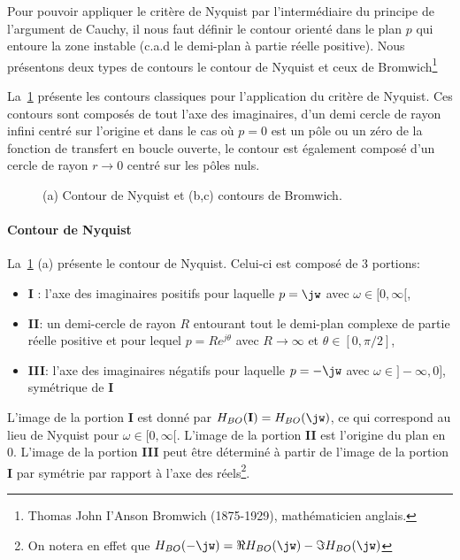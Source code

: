 Pour pouvoir appliquer le critère de Nyquist par l'intermédiaire du principe 
de l'argument de Cauchy, il nous faut définir le contour orienté dans le plan 
$p$ qui entoure la zone instable (c.a.d le demi-plan à partie réelle positive).
Nous présentons deux types de contours le contour de Nyquist et ceux de 
Bromwich\footnote{Thomas John I'Anson Bromwich (1875-1929), mathématicien 
anglais.}

La~\cref{fig-contours} présente les contours classiques pour l'application 
du critère de Nyquist. Ces contours sont composés de tout l'axe des 
imaginaires, d'un demi cercle de rayon infini centré sur l'origine et dans le
cas où $p=0$ est un pôle ou un zéro de la fonction de transfert en boucle 
ouverte, le contour est également composé d'un cercle de rayon 
$r\rightarrow0$ centré sur les pôles nuls.

\captionsetup{width=.9\linewidth} 
\begin{figure}[!h]
    \centering
    
    \caption{(a) Contour de Nyquist et 
             (b,c) contours de Bromwich.\label{fig-contours}} 
\end{figure}
\captionsetup{width=.85\linewidth} 

\paragraph{Contour de Nyquist}

La~\cref{fig-contours} (a) présente le contour de Nyquist. Celui-ci est 
composé de 3 portions:
\begin{itemize}
    \item \textbf{I} : l'axe des imaginaires positifs pour laquelle $p=\jw$ 
          avec $\omega\in[0,\infty[$,
    \item \textbf{II}: un demi-cercle de rayon $R$ entourant tout le 
          demi-plan complexe de partie réelle positive et pour lequel 
          $p=Re^{j\theta}$ avec $R\rightarrow\infty$ et $\theta\in[0,\pi/2]$,
    \item \textbf{III}: l'axe des imaginaires négatifs  pour laquelle $p=-\jw$ 
          avec $\omega\in]-\infty,0]$, symétrique de \textbf{I}
\end{itemize}


L'image de la portion \textbf{I} est donné par 
$H_{BO}(\boldsymbol{\mathrm{I}})=H_{BO}(\jw)$, ce qui correspond au lieu de 
Nyquist pour $\omega\in[0,\infty[$. L'image de la portion \textbf{II} est 
l'origine du plan en 0. L'image de la portion \textbf{III} peut être 
déterminé à partir de l'image de la portion \textbf{I} par symétrie par 
rapport à l'axe des réels\footnote{On notera en effet que 
$H_{BO}(-\jw)=\Re{H_{BO}(\jw)}-\Im{H_{BO}(\jw)}$}.

